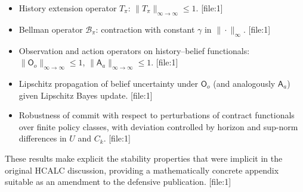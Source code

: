 \documentclass[11pt,a4paper]{article}
\theoremstyle{tealstyle}
\theoremstyle{definition}
\begin{document}
\begin{itemize}[noitemsep]
  \item History extension operator \(T_\pi\): \(\|T_\pi\|_{\infty \to \infty} \le 1\). [file:1]
  \item Bellman operator \(\mathcal{B}_\pi\): contraction with constant \(\gamma\) in \(\|\cdot\|_\infty\). [file:1]
  \item Observation and action operators on history–belief functionals: \(\|\mathsf{O}_o\|_{\infty \to \infty} \le 1\), \(\|\mathsf{A}_a\|_{\infty \to \infty} \le 1\). [file:1]
  \item Lipschitz propagation of belief uncertainty under \(\mathsf{O}_o\) (and analogously \(\mathsf{A}_a\)) given Lipschitz Bayes update. [file:1]
  \item Robustness of commit with respect to perturbations of contract functionals over finite policy classes, with deviation controlled by horizon and sup-norm differences in \(U\) and \(C_k\). [file:1]
\end{itemize}

These results make explicit the stability properties that were implicit in the original HCALC discussion, providing a mathematically concrete appendix suitable as an amendment to the defensive publication. [file:1]


\nocite{*}
  
  
\end{document}
